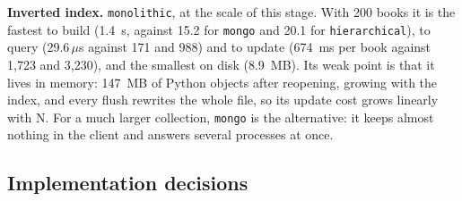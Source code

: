 \documentclass[11pt,a4paper]{article}
\newcommand{\code}[1]{\texttt{#1}}
\newcommand{\us}{\,$\mu$s}
\begin{document}
\textbf{Inverted index.} \code{monolithic}, at the scale of this stage. With 200 books it is the fastest to build (1.4~s,
against 15.2 for \code{mongo} and 20.1 for \code{hierarchical}), to query (29.6\us{} against 171 and
988) and to update (674~ms per book against 1,723 and 3,230), and the smallest on disk (8.9~MB). Its
weak point is that it lives in memory: 147~MB of Python objects after reopening, growing with the
index, and every flush rewrites the whole file, so its update cost grows linearly with N. For a much
larger collection, \code{mongo} is the alternative: it keeps almost nothing in the client and
answers several processes at once.

\subsection{Implementation decisions}
\end{document}
